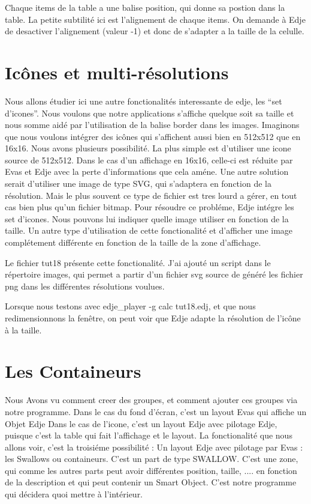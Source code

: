 \documentclass[a4paper]{efr}
\begin{document}
Chaque items de la table a une balise position, qui donne sa postion dans la
table. La petite subtilité ici est l'alignement de chaque items. On demande
à Edje de desactiver l'alignement (valeur -1) et donc de s'adapter a la taille
de la celulle.

\section{Icônes et multi-résolutions}

Nous allons étudier ici une autre fonctionalités interessante de edje, les ``set
d'icones''. Nous voulons que notre applications s'affiche quelque soit sa taille
et nous somme aidé par l'utilisation de la balise border dans les images.
Imaginons que nous voulons intégrer des icônes qui s'affichent aussi bien en
512x512 que en 16x16. Nous avons plusieurs possibilité.
La plus simple est d'utiliser une icone source de 512x512. Dans le cas d'un
affichage en 16x16, celle-ci est réduite par Evas et Edje avec la perte
d'informations que cela améne. Une autre solution serait d'utiliser une image
de type SVG, qui s'adaptera en fonction de la résolution. Mais le plus souvent
ce type de fichier est tres lourd a gérer, en tout cas bien plus qu'un fichier
bitmap.
Pour résoudre ce probléme, Edje intégre les set d'icones. Nous pouvons lui
indiquer quelle image utiliser en fonction de la taille. Un autre type
d'utilisation de cette fonctionalité et d'afficher une image complétement
différente en fonction de la taille de la zone d'affichage.

Le fichier tut18 présente cette fonctionalité. J'ai ajouté un script dans le
répertoire images, qui permet a partir d'un fichier svg source de généré les
fichier png dans les différentes résolutions voulues.

Lorsque nous testons avec edje\_player -g calc tut18.edj, et que nous
redimensionnons la fenêtre, on peut voir que Edje adapte la résolution de
l'icône à la taille.

\section{Les Containeurs}

Nous Avons vu comment creer des groupes, et comment ajouter ces groupes via
notre programme.
Dans le cas du fond d'écran, c'est un layout Evas qui affiche un Objet Edje
Dans le cas de l'icone, c'est un layout Edje avec pilotage Edje, puisque c'est
la table qui fait l'affichage et le layout.
La fonctionalité que nous allons voir, c'est la troisiéme possibilité :
Un layout Edje avec pilotage par Evas : les Swallows ou containeurs.
C'est un part de type SWALLOW. C'est une zone, qui comme les autres parts peut
avoir différentes position, taille, .... en fonction de la description et qui
peut contenir un Smart Object. C'est notre programme qui décidera quoi mettre
à l'intérieur.
\end{document}
